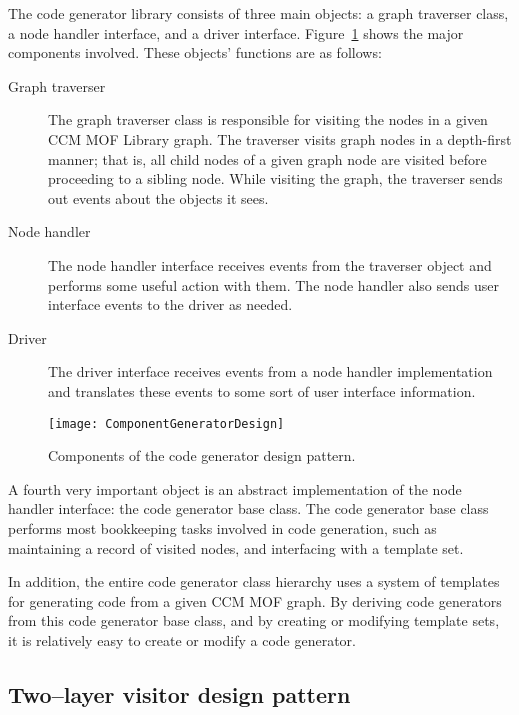 The code generator library consists of three main objects: a graph traverser
class, a node handler interface, and a driver interface.
Figure~\ref{fig:component-generator-design} shows the major components involved.
These objects' functions are as follows:

\begin{description}
\item [Graph traverser] The graph traverser class is responsible for visiting
      the nodes in a given CCM MOF Library graph. The traverser visits graph
      nodes in a depth-first manner; that is, all child nodes of a given graph
      node are visited before proceeding to a sibling node. While visiting the
      graph, the traverser sends out events about the objects it sees.
\item [Node handler] The node handler interface receives events from the
      traverser object and performs some useful action with them. The node
      handler also sends user interface events to the driver as needed.
\item [Driver] The driver interface receives events from a node handler
      implementation and translates these events to some sort of user interface
      information.
\end{description}

\begin{figure}
\centering
\texttt{[image: ComponentGeneratorDesign]}
\caption{Components of the code generator design pattern.}
\label{fig:component-generator-design}
\end{figure}

A fourth very important object is an abstract implementation of the node handler
interface: the code generator base class. The code generator base class performs
most bookkeeping tasks involved in code generation, such as maintaining a record
of visited nodes, and interfacing with a template set.

In addition, the entire code generator class hierarchy uses a system of
templates for generating code from a given CCM MOF graph. By deriving code
generators from this code generator base class, and by creating or modifying
template sets, it is relatively easy to create or modify a code generator.

\subsection{Two--layer visitor design pattern}

